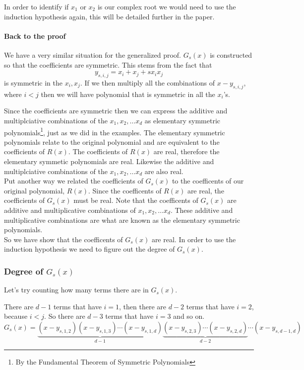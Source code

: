 \documentclass[12pt]{article}
\begin{document}
In order to identify if $x_1$ or $x_2$ is our complex root we would need to use the induction hypothesis again, this will be detailed further in the paper.  


\paragraph*{Back to the proof}
We have a very similar situation for the generalized proof.  $G_s(x)$ is constructed so that the coefficients are symmetric.  This stems from the fact that $$y_{s,i,j} = x_i + x_j + s x_i x_j$$ is symmetric in the $x_i, x_j$.    If we then multiply all the combinations of $x-y_{s,i,j}$, where $i<j$ then we will have polynomial that is symmetric in all the $x_i$'s.

 
  Since the coefficients are symmetric then we can express the additive and multiplciative combinations of the $x_1, x_2, \ldots x_d$ as elementary symmetric polynomials\footnote{By the Fundamental Theorem of Symmetric Polynomials}, just as we did in the examples. The elementary symmetric polynomials relate to the original polynomial and are equivalent to the coefficients of $R(x)$.  The coefficients of $R(x)$ are real, therefore the elementary symmetic polynomials are real.  Likewise the additive and multiplciative combinations of the $x_1, x_2, \ldots x_d$ are also real.\\
  
  Put another way we related the coefficients of $G_s(x)$ to the coefficents of our original polynomial, $R(x)$.  Since the coefficents of $R(x)$ are real, the coefficients of $G_s(x)$ must be real.  Note that the coefficents of $G_s(x)$ are additive and multiplicative combinations of $x_1, x_2, \ldots x_d$.  These additive and multiplicative combinations are what are known as the elementary symmetric polynomials.\\
  
  So we have show that the coefficents of $G_s(x)$ are real.  In order to use the induction hypothesis we need to figure out the degree of $G_s(x)$.

\subsubsection*{Degree of $G_s(x)$}
Let's try counting how many terms there are in $G_s(x)$.

There are $d-1$ terms that have $i=1$, then there are $d-2$ terms that have $i=2$, because $i<j$.  So there are $d-3$ terms that have $i=3$ and so on.
$$ G_s(x) =\underbrace{(x-y_{s,1,2})(x-y_{s,1,3})\cdots(x-y_{s,1,d})}_{d-1} \underbrace{(x-y_{s,2,3})\cdots (x-y_{s,2,d})}_{d-2} \cdots (x-y_{s,d-1,d})$$
\end{document}

